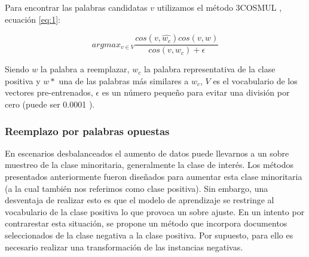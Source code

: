 Para encontrar las palabras candidatas $v$ utilizamos el método 3COSMUL \citep{levy2014linguistic}, ecuación \ref{eq:1}:

\begin{equation} \label{eq:1}
    argmax_{v \in V}\frac{cos(v,\hat{w_c}) cos (v,w)}{cos (v,w_c)+ \epsilon}
\end{equation} 

Siendo $w$ la palabra a reemplazar, $w_c$ la palabra representativa de la clase positiva y $w*$ una de las palabras más similares a $w_c$, $V$ es el vocabulario de los vectores pre-entrenados, $\epsilon$  es un número pequeño para evitar una división por cero (puede ser 0.0001 ).




\subsubsection{Reemplazo por palabras opuestas}


En escenarios desbalanceados el aumento de datos puede llevarnos a un sobre muestreo de la clase minoritaria,  generalmente la clase de interés. Los métodos presentados anteriormente fueron diseñados para aumentar esta clase minoritaria (a la cual también nos referimos como clase positiva). Sin embargo, una desventaja de realizar esto es que el modelo de aprendizaje se restringe al vocabulario de la clase positiva lo que provoca un sobre ajuste. En un intento por contrarestar esta situación, se propone un método que incorpora documentos seleccionados de la clase negativa a la clase positiva. Por supuesto, para ello es necesario realizar una transformación de las instancias negativas.

